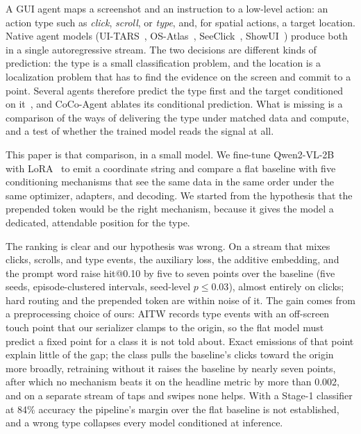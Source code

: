 \documentclass{article}
\makeatletter
\newcommand{\hitat}[1]{hit@#1}
\makeatother
\begin{document}
A GUI agent maps a screenshot and an instruction to a low-level action: an action type such as \emph{click}, \emph{scroll}, or \emph{type}, and, for spatial actions, a target location. Native agent models (UI-TARS~\citep{uitars}, OS-Atlas~\citep{osatlas}, SeeClick~\citep{seeclick}, ShowUI~\citep{showui}) produce both in a single autoregressive stream. The two decisions are different kinds of prediction: the type is a small classification problem, and the location is a localization problem that has to find the evidence on the screen and commit to a point. Several agents therefore predict the type first and the target conditioned on it~\citep{cocoagent,limac,hiagent}, and CoCo-Agent ablates its conditional prediction. What is missing is a comparison of the ways of delivering the type under matched data and compute, and a test of whether the trained model reads the signal at all.

This paper is that comparison, in a small model. We fine-tune Qwen2-VL-2B~\citep{qwen2vl} with LoRA~\citep{lora} to emit a coordinate string and compare a flat baseline with five conditioning mechanisms that see the same data in the same order under the same optimizer, adapters, and decoding. We started from the hypothesis that the prepended token would be the right mechanism, because it gives the model a dedicated, attendable position for the type.

The ranking is clear and our hypothesis was wrong. On a stream that mixes clicks, scrolls, and type events, the auxiliary loss, the additive embedding, and the prompt word raise \hitat{0.10} by five to seven points over the baseline (five seeds, episode-clustered intervals, seed-level $p \le 0.03$), almost entirely on clicks; hard routing and the prepended token are within noise of it. The gain comes from a preprocessing choice of ours: AITW records type events with an off-screen touch point that our serializer clamps to the origin, so the flat model must predict a fixed point for a class it is not told about. Exact emissions of that point explain little of the gap; the class pulls the baseline's clicks toward the origin more broadly, retraining without it raises the baseline by nearly seven points, after which no mechanism beats it on the headline metric by more than 0.002, and on a separate stream of taps and swipes none helps. With a Stage-1 classifier at 84\% accuracy the pipeline's margin over the flat baseline is not established, and a wrong type collapses every model conditioned at inference.
\end{document}
